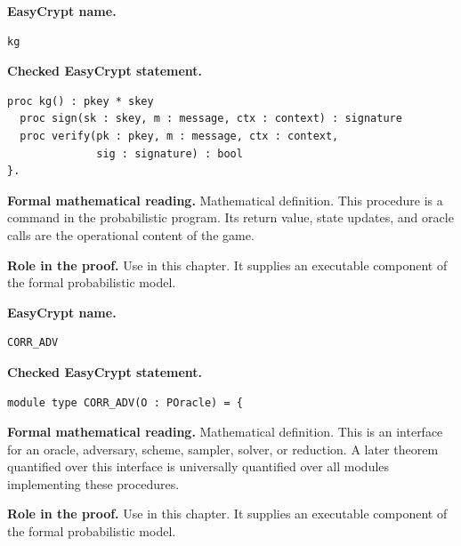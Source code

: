 \begin{formaldefinition}
\noindent\textbf{EasyCrypt name.}
\begin{lstlisting}[language=EasyCrypt,basicstyle=\ttfamily\scriptsize]
kg
\end{lstlisting}
\noindent\textbf{Checked EasyCrypt statement.}
\begin{lstlisting}[language=EasyCrypt,basicstyle=\ttfamily\scriptsize]
proc kg() : pkey * skey
  proc sign(sk : skey, m : message, ctx : context) : signature
  proc verify(pk : pkey, m : message, ctx : context,
              sig : signature) : bool
}.
\end{lstlisting}
\noindent\textbf{Formal mathematical reading.}
Mathematical definition. This procedure is a command in the probabilistic program.  Its return value, state updates, and oracle calls are the operational content of the game.

\noindent\textbf{Role in the proof.}
Use in this chapter. It supplies an executable component of the formal probabilistic model.

\end{formaldefinition}

\begin{formaldefinition}
\noindent\textbf{EasyCrypt name.}
\begin{lstlisting}[language=EasyCrypt,basicstyle=\ttfamily\scriptsize]
CORR_ADV
\end{lstlisting}
\noindent\textbf{Checked EasyCrypt statement.}
\begin{lstlisting}[language=EasyCrypt,basicstyle=\ttfamily\scriptsize]
module type CORR_ADV(O : POracle) = {
\end{lstlisting}
\noindent\textbf{Formal mathematical reading.}
Mathematical definition. This is an interface for an oracle, adversary, scheme, sampler, solver, or reduction.  A later theorem quantified over this interface is universally quantified over all modules implementing these procedures.

\noindent\textbf{Role in the proof.}
Use in this chapter. It supplies an executable component of the formal probabilistic model.

\end{formaldefinition}


